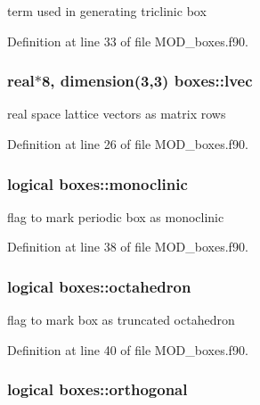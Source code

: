 term used in generating triclinic box 



Definition at line 33 of file M\-O\-D\-\_\-boxes.\-f90.

\hypertarget{classboxes_a3594e3020185258991c3e1d4e3875f68}{
\subsubsection[{lvec}]{\setlength{\rightskip}{0pt plus 5cm}real$\ast$8, dimension(3,3) boxes\-::lvec}}\label{classboxes_a3594e3020185258991c3e1d4e3875f68}


real space lattice vectors as matrix rows 



Definition at line 26 of file M\-O\-D\-\_\-boxes.\-f90.

\hypertarget{classboxes_a5b089e02ceadb0f2e89c8deec0d87491}{
\subsubsection[{monoclinic}]{\setlength{\rightskip}{0pt plus 5cm}logical boxes\-::monoclinic}}\label{classboxes_a5b089e02ceadb0f2e89c8deec0d87491}


flag to mark periodic box as monoclinic 



Definition at line 38 of file M\-O\-D\-\_\-boxes.\-f90.

\hypertarget{classboxes_ae928df89d1aa69fc06a8e8ba5db3b9a6}{
\subsubsection[{octahedron}]{\setlength{\rightskip}{0pt plus 5cm}logical boxes\-::octahedron}}\label{classboxes_ae928df89d1aa69fc06a8e8ba5db3b9a6}


flag to mark box as truncated octahedron 



Definition at line 40 of file M\-O\-D\-\_\-boxes.\-f90.

\hypertarget{classboxes_a504790714b65897e53bbf86bdffd8ef2}{
\subsubsection[{orthogonal}]{\setlength{\rightskip}{0pt plus 5cm}logical boxes\-::orthogonal}}\label{classboxes_a504790714b65897e53bbf86bdffd8ef2}


